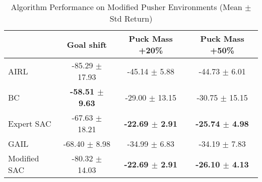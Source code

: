 \documentclass{article}
\begin{document}

\begin{table}
\caption{Algorithm Performance on Modified Pusher Environments (Mean $\pm$ Std Return)}
\label{tab:perf_mod_pusher}
\begin{adjustbox}{max width=\textwidth, center}
\begin{tabular}{lccc}
\toprule
 & Goal shift & Puck Mass +20\% & Puck Mass +50\% \\
\midrule
AIRL & -85.29 $\pm$ 17.93 & -45.14 $\pm$ 5.88 & -44.73 $\pm$ 6.01 \\
BC & \textbf{-58.51 $\pm$ 9.63} & -29.00 $\pm$ 13.15 & -30.75 $\pm$ 15.15 \\
Expert SAC & -67.63 $\pm$ 18.21 & \textbf{-22.69 $\pm$ 2.91} & \textbf{-25.74 $\pm$ 4.98} \\
GAIL & -68.40 $\pm$ 8.98 & -34.99 $\pm$ 6.83 & -34.19 $\pm$ 7.83 \\
Modified SAC & -80.32 $\pm$ 14.03 & \textbf{-22.69 $\pm$ 2.91} & \textbf{-26.10 $\pm$ 4.13} \\
\bottomrule
\end{tabular}
\end{adjustbox}
\end{table}
\end{document}
